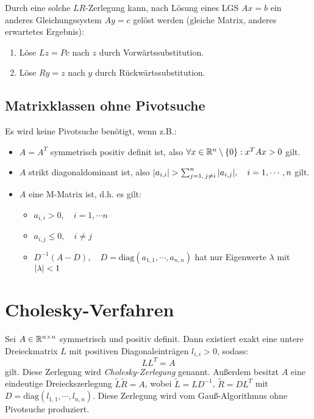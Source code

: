 				Durch eine solche \(LR\)-Zerlegung kann, nach Lösung eines LGS \( Ax = b \) ein anderes Gleichungssystem \( Ay = c \) gelöst werden (gleiche Matrix, anderes erwartetes Ergebnis):
				\begin{enumerate}
					\item Löse \( Lz = Pc \) nach \(z\) durch Vorwärtssubstitution.
					\item Löse \( Ry = z \) nach \(y\) durch Rückwärtssubstitution.
				\end{enumerate}

			\subsection{Matrixklassen ohne Pivotsuche}
				Es wird keine Pivotsuche benötigt, wenn z.B.:
				\begin{itemize}
					\item \( A = A^T \) symmetrisch positiv definit ist, also \( \forall x \in \mathbb{R}^n \setminus \{0\} : x^T A x > 0 \) gilt.
					\item \(A\) strikt diagonaldominant ist, also \( \abs{a_{i,i}} > \sum_{j = 1,\, j \neq i}^{n} \abs{a_{i,j}}, \quad i = 1, \cdots, n \) gilt.
					\item \(A\) eine M-Matrix ist, d.h. es gilt:
						\begin{itemize}
							\item \( a_{i,i} > 0, \quad i = 1, \cdots n \)
							\item \( a_{i,j} \leq 0, \quad i \neq j \)
							\item \( D^{-1} (A - D), \quad D = \textrm{diag}(a_{1,1}, \cdots, a_{n,n}) \) hat nur Eigenwerte \(\lambda\) mit \( \abs{\lambda} < 1 \)
						\end{itemize}
				\end{itemize}

		\section{Cholesky-Verfahren}
			Sei \(A \in \mathbb{R}^{n \times n}\) symmetrisch und positiv definit. Dann existiert exakt eine untere Dreieckmatrix \(L\) mit positiven Diagonaleinträgen \( l_{i,i} > 0 \), sodass:
			\begin{equation*}
				LL^T = A
			\end{equation*}
			gilt. Diese Zerlegung wird \textit{Cholesky-Zerlegung} genannt. Außerdem besitzt \(A\) eine eindeutige Dreieckszerlegung \( \tilde{L}\tilde{R} = A \), wobei \( \tilde{L} = LD^{-1} \), \( \tilde{R} = DL^T \) mit \( D = \textrm{diag}(l_{1,1}, \cdots, l_{n,n}) \). Diese Zerlegung wird vom Gauß-Algorithmus ohne Pivotsuche produziert.

